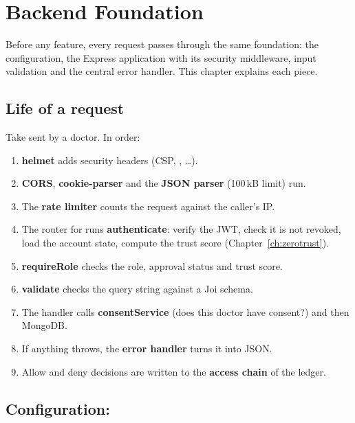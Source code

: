 \chapter{Backend Foundation}\label{ch:foundation}

Before any feature, every request passes through the same foundation: the
configuration, the Express application with its security middleware, input
validation and the central error handler. This chapter explains each piece.

\section{Life of a request}

Take  sent by a doctor. In order:

\begin{enumerate}
  \item \textbf{helmet} adds security headers (CSP, , \ldots).
  \item \textbf{CORS}, \textbf{cookie-parser} and the \textbf{JSON parser}
    (100\,kB limit) run.
  \item The \textbf{rate limiter} counts the request against the caller's IP.
  \item The router for  runs \textbf{authenticate}: verify
    the JWT, check it is not revoked, load the account state, compute the
    trust score (Chapter~\ref{ch:zerotrust}).
  \item \textbf{requireRole}
    checks the role, approval status and trust score.
  \item \textbf{validate} checks the query string against a Joi schema.
  \item The handler calls \textbf{consentService} (does this doctor have
    consent?) and then MongoDB.
  \item If anything throws, the \textbf{error handler} turns it into JSON.
  \item Allow and deny decisions are written to the \textbf{access chain} of
    the ledger.
\end{enumerate}

\section{Configuration: }

